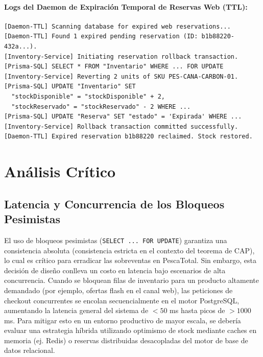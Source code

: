 \documentclass[12pt,a4paper]{article}
\begin{document}
\paragraph{Logs del Daemon de Expiración Temporal de Reservas Web (TTL):}
\begin{verbatim}
[Daemon-TTL] Scanning database for expired web reservations...
[Daemon-TTL] Found 1 expired pending reservation (ID: b1b88220-432a...).
[Inventory-Service] Initiating reservation rollback transaction.
[Prisma-SQL] SELECT * FROM "Inventario" WHERE ... FOR UPDATE
[Inventory-Service] Reverting 2 units of SKU PES-CANA-CARBON-01.
[Prisma-SQL] UPDATE "Inventario" SET 
  "stockDisponible" = "stockDisponible" + 2,
  "stockReservado" = "stockReservado" - 2 WHERE ...
[Prisma-SQL] UPDATE "Reserva" SET "estado" = 'Expirada' WHERE ...
[Inventory-Service] Rollback transaction committed successfully.
[Daemon-TTL] Expired reservation b1b88220 reclaimed. Stock restored.
\end{verbatim}

\newpage
\section{Análisis Crítico}

\subsection{Latencia y Concurrencia de los Bloqueos Pesimistas}
El uso de bloqueos pesimistas (\texttt{SELECT ... FOR UPDATE}) garantiza una consistencia absoluta (consistencia estricta en el contexto del teorema de CAP), lo cual es crítico para erradicar las sobreventas en PescaTotal. Sin embargo, esta decisión de diseño conlleva un costo en latencia bajo escenarios de alta concurrencia. Cuando se bloquean filas de inventario para un producto altamente demandado (por ejemplo, ofertas flash en el canal web), las peticiones de checkout concurrentes se encolan secuencialmente en el motor PostgreSQL, aumentando la latencia general del sistema de $<50$ ms hasta picos de $>1000$ ms. Para mitigar esto en un entorno productivo de mayor escala, se debería evaluar una estrategia híbrida utilizando optimismo de stock mediante caches en memoria (ej. Redis) o reservas distribuidas desacopladas del motor de base de datos relacional.
\end{document}
